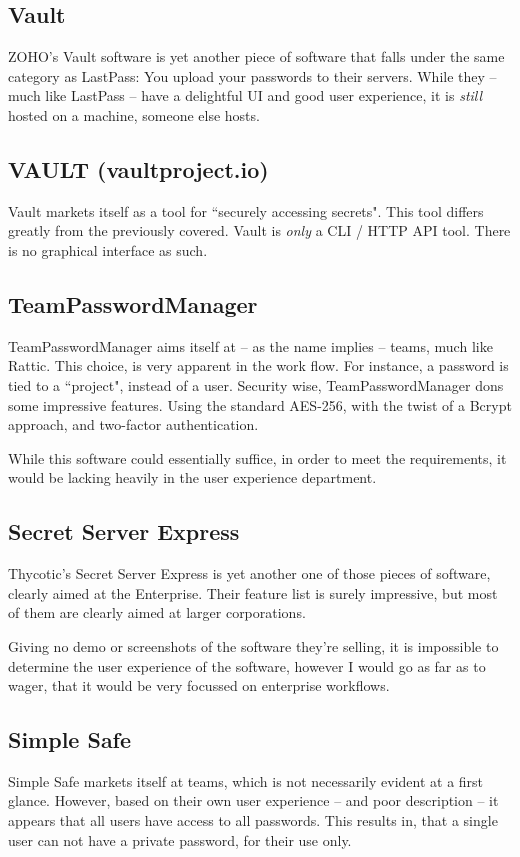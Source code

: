 		\subsection{Vault}
			ZOHO's Vault software is yet another piece of software that falls under the same category as LastPass: You upload your passwords to their servers. While they -- much like LastPass -- have a delightful UI and good user experience, it is \emph{still} hosted on a machine, someone else hosts.

			
		\subsection{VAULT (vaultproject.io)}
			Vault markets itself as a tool for ``securely accessing secrets". This tool differs greatly from the previously covered. Vault is \emph{only} a CLI / HTTP API tool. There is no graphical interface as such.

		\subsection{TeamPasswordManager}
			TeamPasswordManager aims itself at -- as the name implies -- teams, much like Rattic. This choice, is very apparent in the work flow. For instance, a password is tied to a ``project", instead of a user. Security wise, TeamPasswordManager dons some impressive features. Using the standard AES-256, with the twist of a Bcrypt approach, and two-factor authentication.

			While this software could essentially suffice, in order to meet the requirements, it would be lacking heavily in the user experience department.



		\subsection{Secret Server Express}
			Thycotic's Secret Server Express is yet another one of those pieces of software, clearly aimed at the Enterprise. Their feature list is surely impressive, but most of them are clearly aimed at larger corporations. 

			Giving no demo or screenshots of the software they're selling, it is impossible to determine the user experience of the software, however I would go as far as to wager, that it would be very focussed on enterprise workflows.

		\subsection{Simple Safe}
			Simple Safe markets itself at teams, which is not necessarily evident at a first glance. However, based on their own user experience -- and poor description -- it appears that all users have access to all passwords. This results in, that a single user can not have a private password, for their use only.

